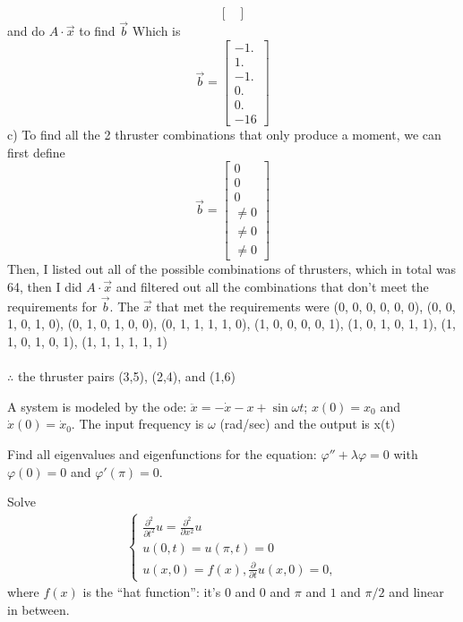 \documentclass[12pt]{exam}
\newcommand{\pt}{\frac{\partial}{\partial t}}
\newcommand{\pxx}{\frac{\partial^2}{\partial x^2}}
\newcommand{\ptt}{\frac{\partial^2}{\partial t^2}}
\begin{document}
\begin{questions}
\begin{solutionorbox}[\stretch{1}]
\[\begin{bmatrix}
\end{bmatrix}
\]
and do \(A \cdot \vec{x}\) to find \(\vec{b}\) Which is
\[\vec{b} = \begin{bmatrix}
 -1. \\ 1. \\ -1. \\ 0. \\ 0. \\ -16 
\end{bmatrix}
\]
c)
To find all the 2 thruster combinations that only produce a moment, we can first define \[\vec{b} = \begin{bmatrix}
  0\\0\\0\\ \neq 0 \\ \neq 0 \\ \neq 0
\end{bmatrix}
\]
Then, I listed out all of the possible combinations of thrusters, which in total was 64, then I did \(A \cdot \vec{x}\) and filtered out all the combinations that don't meet the requirements for \(\vec{b}\).
The \(\vec{x}\) that met the requirements were (0, 0, 0, 0, 0, 0), (0, 0, 1, 0, 1, 0), (0, 1, 0, 1, 0, 0), (0, 1, 1, 1, 1, 0), (1, 0, 0, 0, 0, 1), (1, 0, 1, 0, 1, 1), (1, 1, 0, 1, 0, 1), (1, 1, 1, 1, 1, 1)
\\
\\
\(\therefore\) the thruster pairs (3,5), (2,4), and (1,6)
\end{solutionorbox}

\newpage 
\begin{question}
A system is modeled by the ode: \(\ddot{x} = -\dot{x} - x + \sin \omega t\); \(x(0) = x_0\) and \(\dot{x}(0) = \dot{x}_0\). The input
frequency is \(\omega\) (rad/sec) and the output is x(t)
\end{question}
\begin{solutionorbox}[\stretch{1}]
\end{solutionorbox}


\newpage 
\begin{question}
Find all eigenvalues and eigenfunctions for the equation: 
$\varphi'' + \lambda \varphi = 0$ with $\varphi(0) = 0$ and $\varphi'(\pi) = 0.$
\end{question}
\begin{solutionorbox}[\stretch{1}]
\end{solutionorbox}


\newpage 
\begin{question}
Solve 
\begin{align*}
\begin{cases}
\ptt u = \pxx u\\ 
u(0, t) = u(\pi, t) = 0\\ 
u(x,0) = f(x), \pt u(x,0) = 0,
\end{cases}
\end{align*}
where $f(x)$ is the ``hat function'': it's $0$ and $0$ and $\pi$ and $1$ and $\pi/2$ and 
linear in between. 
\end{question}
\begin{solutionorbox}[\stretch{1}]
\end{solutionorbox}



\end{questions}
\end{document}
